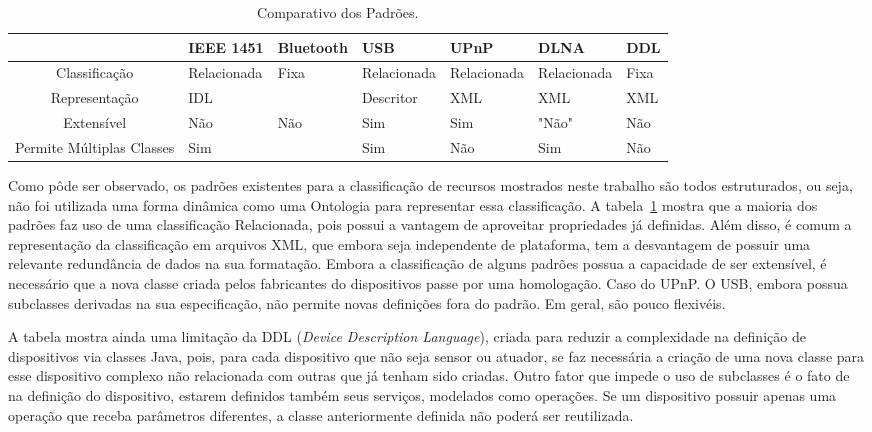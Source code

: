 \begin{table}
	\begin{center}
		\begin{tabular}{cllllll}
		\hline
									& \textbf{IEEE 1451}	& \textbf{Bluetooth} 	& \textbf{USB}	& \textbf{UPnP} & \textbf{DLNA} & \textbf{DDL}\\
		\hline
		\hline
		Classificação 				& Relacionada 			& Fixa 					& Relacionada 	& Relacionada 	& Relacionada 	& Fixa \\
		\hline
		Representação 				& IDL 					&						& Descritor		& XML			& XML & XML \\ 
		\hline
		Extensível 					& Não 					& Não 					& Sim 			& Sim 			& "Não" & Não \\
		\hline
		Permite Múltiplas Classes 	& Sim 					&						& Sim 			& Não 			& Sim & Não \\
		\hline
		\end{tabular}
	\end{center}
	\caption{Comparativo dos Padrões.}
	\label{tab:comparativo}
\end{table}
 
Como pôde ser observado, os padrões existentes para a classificação de recursos mostrados neste trabalho são todos estruturados, ou seja, não foi utilizada uma forma dinâmica como uma Ontologia para representar essa classificação. A tabela~\ref{tab:comparativo} mostra que a maioria dos padrões faz uso de uma classificação Relacionada, pois possui a vantagem de aproveitar propriedades já definidas. Além disso, é comum a representação da classificação em arquivos XML, que embora seja independente de plataforma, tem a desvantagem de possuir uma relevante redundância de dados na sua formatação. Embora a classificação de alguns padrões possua a capacidade de ser extensível, é necessário que a nova classe criada pelos fabricantes do dispositivos passe por uma homologação. Caso do UPnP. O USB, embora possua subclasses derivadas na sua especificação, não permite novas definições fora do padrão. Em geral, são pouco flexivéis. 

A tabela mostra ainda uma limitação da DDL (\emph{Device Description Language}), criada para reduzir a complexidade na definição de dispositivos via classes Java, pois, para cada dispositivo que não seja sensor ou atuador, se faz necessária a criação de uma nova classe para esse dispositivo complexo não relacionada com outras que já tenham sido criadas. Outro fator que impede o uso de subclasses é o fato de na definição do dispositivo, estarem definidos também seus serviços, modelados como operações. Se um dispositivo possuir apenas uma operação que receba parâmetros diferentes, a classe anteriormente definida não poderá ser reutilizada. 



